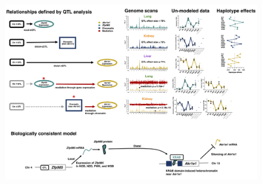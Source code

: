 \documentclass[10pt,letterpaper]{article}
\begin{document}
\newpage

\begin{figure}[hp]
\includegraphics[width=\textwidth, trim={0in 0.1in 0in 0in}, clip]{figs/akr1e1_full_model_update.png}
\caption{}
\end{figure}
\end{document}
